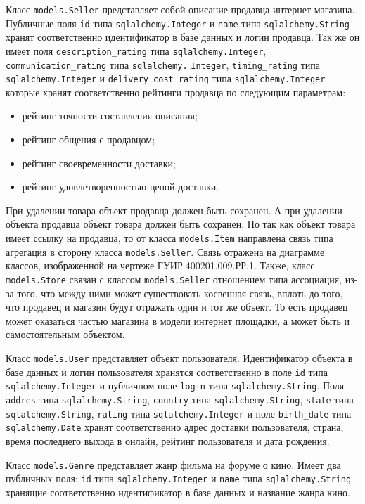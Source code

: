 Класс \texttt{mo\-dels.Seller} представляет собой описание продавца интернет магазина. Публичные поля \texttt{id} типа \texttt{sqlalchemy.Integer} и \texttt{name} типа \texttt{sqlal\-chemy.String} хранят соответственно идентификатор в базе данных и логин продавца. Так же он имеет поля \texttt{description\_rating} типа \texttt{sqlalchemy.In\-teger}, \texttt{communication\_rating} типа \texttt{sqlalchemy.} \texttt{Integer}, \texttt{timing\_rating} типа \texttt{sqlalchemy.Integer} и \texttt{delivery\_\-cost\_rating} типа \texttt{sqlalchemy.Integer} которые хранят соответственно рейтинги продавца по следующим параметрам:
\begin{itemize}
\item рейтинг точности составления описания;
\item рейтинг общения с продавцом;
\item рейтинг своевременности доставки;
\item рейтинг удовлетворенностью ценой доставки.
\end{itemize}
При удалении товара объект продавца должен быть сохранен. А при удалении объекта продавца объект товара должен быть сохранен. Но так как объект товара имеет ссылку на продавца, то от класса \texttt{mo\-dels.Item} направлена связь типа агрегация в сторону класса \texttt{mo\-dels.Seller}. Связь отражена на диаграмме классов, изображенной на чертеже ГУИР.400201.009.РР.1. Также, класс \texttt{mo\-dels.Store} связан с классом \texttt{mo\-dels.Seller} отношением типа ассоциация, из-за того, что между ними может существовать косвенная связь, вплоть до того, что продавец и магазин будут отражать один и тот же объект. То есть продавец может оказаться частью магазина в модели интернет площадки, а может быть и самостоятельным объектом.

Класс \texttt{mo\-dels.User} представляет объект пользователя. Идентификатор объекта в базе данных и логин пользователя хранятся соответственно в поле \texttt{id} типа \texttt{sqlalchemy.Integer} и публичном поле \texttt{login} типа \texttt{sqlalchemy.String}. Поля \texttt{addres} типа \texttt{sqlalchemy.String}, \texttt{coun\-try} типа \texttt{sqlalchemy.String}, \texttt{sta\-te} типа \texttt{sqlalchemy.String}, \texttt{ra\-ting} типа \texttt{sqlalchemy.Integer} и  поле \texttt{birth\_date} типа \texttt{sqlal\-che\-my.Date} хранят соответственно адрес доставки пользователя, страна, время последнего выхода в онлайн, рейтинг пользователя и дата рождения.

Класс \texttt{mo\-dels.Genre} представляет жанр фильма на форуме о кино. Имеет два публичных поля: \texttt{id} типа \texttt{sqlalchemy.Integer} и \texttt{name} типа \texttt{sqlalche\-my.String} хранящие соответственно идентификатор в базе данных и название жанра кино.

